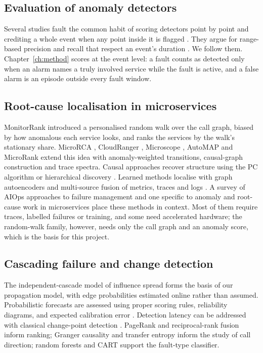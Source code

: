 \subsection{Evaluation of anomaly detectors}
Several studies fault the common habit of scoring detectors point by point and crediting a whole event when any point inside it is flagged \cite{wu2021flawed,kim2022rigorous}. They argue for range-based precision and recall that respect an event's duration \cite{tatbul2018precision}. We follow them. Chapter~\ref{ch:method} scores at the event level: a fault counts as detected only when an alarm names a truly involved service while the fault is active, and a false alarm is an episode outside every fault window.

\subsection{Root-cause localisation in microservices}
MonitorRank \cite{kim2013monitorrank} introduced a personalised random walk over the call graph, biased by how anomalous each service looks, and ranks the services by the walk's stationary share. MicroRCA \cite{wu2020microrca}, CloudRanger \cite{wang2018cloudranger}, Microscope \cite{lin2018microscope}, AutoMAP \cite{ma2020automap} and MicroRank \cite{yu2021microrank} extend this idea with anomaly-weighted transitions, causal-graph construction and trace spectra. Causal approaches recover structure using the PC algorithm or hierarchical discovery \cite{ikram2022rcd,li2022circa,xin2023causalrca}. Learned methods localise with graph autoencoders and multi-source fusion of metrics, traces and logs \cite{sun2024deephunt,zhang2023diagfusion,lee2023eadro,wang2021groot}. A survey of AIOps approaches to failure management \cite{notaro2021survey} and one specific to anomaly and root-cause work in microservices \cite{soldani2022survey} place these methods in context. Most of them require traces, labelled failures or training, and some need accelerated hardware; the random-walk family, however, needs only the call graph and an anomaly score, which is the basis for this project.

\subsection{Cascading failure and change detection}
The independent-cascade model of influence spread \cite{kempe2003influence} forms the basis of our propagation model, with edge probabilities estimated online rather than assumed. Probabilistic forecasts are assessed using proper scoring rules, reliability diagrams, and expected calibration error \cite{brier1950verification,niculescu2005predicting,guo2017calibration}. Detection latency can be addressed with classical change-point detection \cite{page1954cusum,adams2007bocpd}. PageRank \cite{page1999pagerank} and reciprocal-rank fusion \cite{cormack2009rrf} inform ranking; Granger causality \cite{granger1969} and transfer entropy \cite{schreiber2000te} inform the study of call direction; random forests and CART \cite{breiman2001rf,breiman1984cart} support the fault-type classifier.

